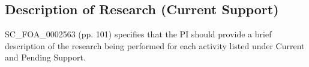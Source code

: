 \newlength{\supportoffset}
\setlength{\supportoffset}{\headheight}
\addtolength{\supportoffset}{\baselineskip}



\clearpage

\subsection{Description of Research (Current Support)}

SC\_FOA\_0002563 (pp. 101) specifies that the PI should provide a brief description of the research being performed for each activity listed under Current and Pending Support.

\clearpage